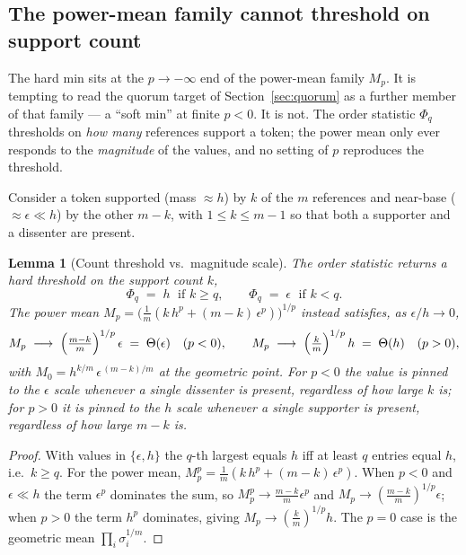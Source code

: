 \documentclass[11pt]{article}
\newtheorem{lemma}{Lemma}
\begin{document}
\subsection{The power-mean family cannot threshold on support count}
\label{app:quorum}

The hard min sits at the $p \to -\infty$ end of the power-mean family $M_p$. It is tempting to read the quorum target of Section~\ref{sec:quorum} as a further member of that family --- a ``soft min'' at finite $p < 0$. It is not. The order statistic $\Phi_q$ thresholds on \emph{how many} references support a token; the power mean only ever responds to the \emph{magnitude} of the values, and no setting of $p$ reproduces the threshold.

Consider a token supported (mass $\approx h$) by $k$ of the $m$ references and near-base ($\approx \epsilon \ll h$) by the other $m - k$, with $1 \le k \le m-1$ so that both a supporter and a dissenter are present.

\begin{lemma}[Count threshold vs.\ magnitude scale]
\label{lem:sep}
The order statistic returns a hard threshold on the support count $k$,
\[
\Phi_q \;=\; h \;\text{ if } k \ge q, \qquad \Phi_q \;=\; \epsilon \;\text{ if } k < q.
\]
The power mean $M_p = \bigl(\tfrac1m(k\,h^p + (m-k)\,\epsilon^p)\bigr)^{1/p}$ instead satisfies, as $\epsilon/h \to 0$,
\[
M_{p} \;\longrightarrow\; \Bigl(\tfrac{m-k}{m}\Bigr)^{1/p}\,\epsilon \;=\; \Theta(\epsilon) \quad (p < 0), \qquad
M_{p} \;\longrightarrow\; \Bigl(\tfrac{k}{m}\Bigr)^{1/p}\,h \;=\; \Theta(h) \quad (p > 0),
\]
with $M_0 = h^{k/m}\,\epsilon^{\,(m-k)/m}$ at the geometric point. For $p<0$ the value is pinned to the $\epsilon$ scale whenever a single dissenter is present, regardless of how large $k$ is; for $p>0$ it is pinned to the $h$ scale whenever a single supporter is present, regardless of how large $m-k$ is.
\end{lemma}

\begin{proof}
With values in $\{\epsilon,h\}$ the $q$-th largest equals $h$ iff at least $q$ entries equal $h$, i.e.\ $k \ge q$. For the power mean, $M_p^p = \tfrac1m(k\,h^p + (m-k)\,\epsilon^p)$. When $p < 0$ and $\epsilon \ll h$ the term $\epsilon^p$ dominates the sum, so $M_p^p \to \tfrac{m-k}{m}\epsilon^p$ and $M_p \to (\tfrac{m-k}{m})^{1/p}\epsilon$; when $p > 0$ the term $h^p$ dominates, giving $M_p \to (\tfrac{k}{m})^{1/p}h$. The $p=0$ case is the geometric mean $\prod_i \sigma_i^{1/m}$.
\end{proof}
\end{document}
